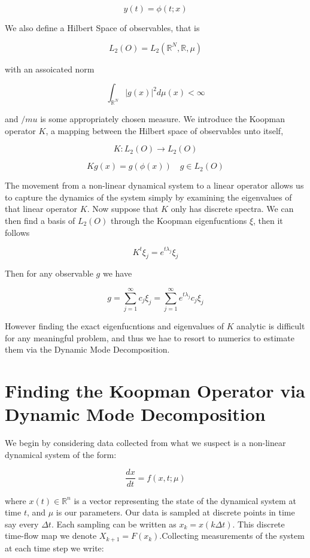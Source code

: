 $$
y(t) = \phi(t;x)
$$

We also define a Hilbert Space of observables, that is 

$$
L_2(O) = L_2(\mathbb{R}^N, \mathbb{R}, \mu)
$$

with an assoicated norm 

$$
\int_{\mathbb{R}^N} |g(x) |^2 d\mu(x)  < \infty
$$

and $/mu$ is some appropriately chosen measure. We introduce the Koopman
operator $K$, a mapping between the Hilbert space of observables unto itself,

$$
K: L_2(O) \rightarrow L_2(O)
$$

$$
Kg(x) = g(\phi(x)) \quad g \in L_2(O)
$$

The movement from a non-linear dynamical system to a linear operator allows us
to capture the dynamics of the system simply by examining the eigenvalues of 
that linear operator $K$. Now suppose that $K$ only has discrete spectra. We can then find a basis of 
$L_2(O)$ through the Koopman eigenfucntions $\xi$, then it follows

$$
K^t \xi_j = e^{t\lambda_j}\xi_j
$$

Then for any observable $g$ we have

$$
g = \sum^{\infty}_{j=1} c_j \xi_j = \sum^{\infty}_{j=1} e^{t\lambda_j}c_j\xi_j
$$

However finding the exact eigenfucntions and eigenvalues of $K$ analytic
is difficult for any meaningful problem, and thus we hae to resort to
numerics to estimate them via the Dynamic Mode Decomposition.


\section{Finding the Koopman Operator via Dynamic Mode Decomposition}

We begin by considering data collected from what we suspect is a non-linear dynamical system
of the form:

$$
\frac{dx}{dt} = f(x,t; \mu)
$$

where $x(t)\in \mathbb{R}^{n}$ is a vector representing the state of the dynamical system
at time $t$, and $\mu$ is our parameters. Our data is sampled at discrete points in time
say every $\Delta t$. Each sampling can be written as $x_{k} = x(k \Delta t)$. This 
discrete time-flow map we denote $X_{k+1} = F(x_k)$.Collecting measurements of the system at each time step
we write:

